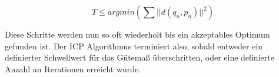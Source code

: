 \begin{equation}
T \leq argmin (\sum || d(q_{n}, p_{n}) || ^{2})
\end{equation}

\noindent Diese Schritte werden nun so oft wiederholt bis ein akzeptables Optimum gefunden ist. Der ICP Algorithmus terminiert also, sobald entweder ein definierter Schwellwert für das Gütemaß überschritten, oder eine definierte Anzahl an Iterationen erreicht wurde.

